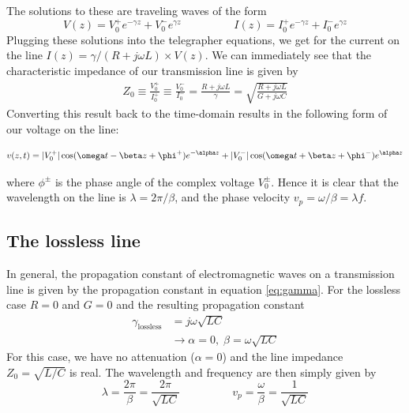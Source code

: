 The solutions to these are traveling waves of the form
\begin{equation}
V(z) = V_0^+e^{-\gamma z} + V_0^-e^{\gamma z} \hspace{2cm} I(z) = I_0^+e^{-\gamma z} + I_0^-e^{\gamma z}
\label{eq:telegraph:solution}
\end{equation}
Plugging these solutions into the telegrapher equations, we get for the current on the line $I(z)=\gamma/(R+j\omega L) \times V(z)$.
We can immediately see that the characteristic impedance of our transmission line is given by
\begin{align}
Z_0 \equiv \frac{V_0^+}{I_0^+}\equiv \frac{V_0^-}{I_0^-}= \frac{R+j\omega L}{\gamma} = \sqrt{\frac{R+j\omega L}{G + j\omega C}}
\end{align}
Converting this result back to the time-domain results in the following form of our voltage on the line:

\begin{align}
v(z,t) = \abs{V_0^+}\cos(\omega t-\beta z+\phi^+)e^{-\alpha z} + \abs{V_0^-}\cos(\omega t+\beta z+\phi^-)e^{\alpha z}
\end{align}

where $\phi^{\pm}$ is the phase angle of the complex voltage $V_0^{\pm}$.
Hence it is clear that the wavelength on the line is $\lambda=2\pi/\beta$, and the phase velocity $v_p=\omega/\beta=\lambda f$.
\subsection{The lossless line}
In general, the propagation constant of electromagnetic waves on a transmission line is given by the propagation constant in equation \ref{eq:gamma}.
For the lossless case $R=0$ and $G=0$ and the resulting propagation constant
\begin{align}
\gamma_\text{lossless} &= j\omega\sqrt{LC} \\%
&\rightarrow \alpha=0, \; \beta=\omega\sqrt{LC}
\end{align}
For this case, we have no attenuation ($\alpha=0$) and the line impedance $Z_0=\sqrt{L/C}$ is real.
The wavelength and frequency are then simply given by
\begin{equation}
\lambda = \frac{2\pi}{\beta} = \frac{2\pi}{\sqrt{LC}} \hspace{2cm} v_p=\frac{\omega}{\beta}=\frac{1}{\sqrt{LC}}
\end{equation}

